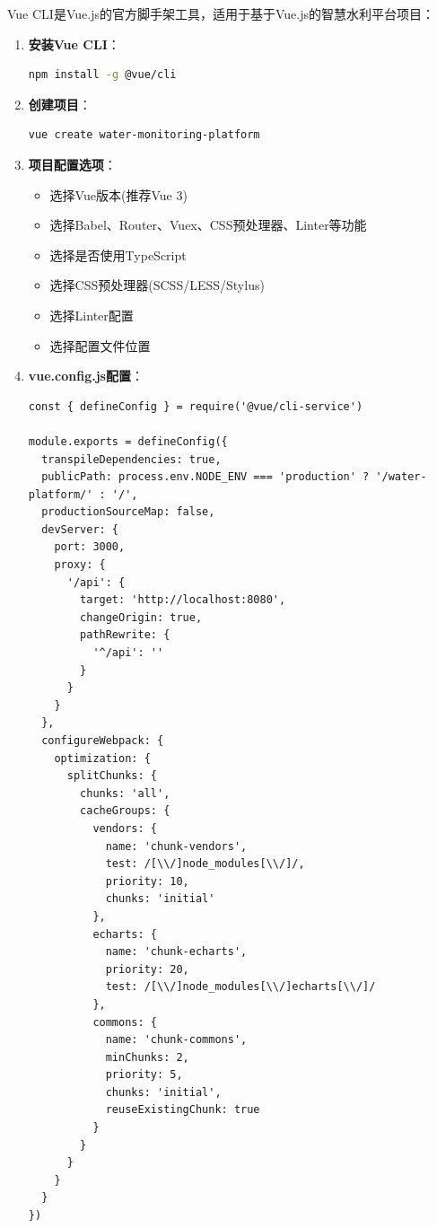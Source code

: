Vue CLI是Vue.js的官方脚手架工具，适用于基于Vue.js的智慧水利平台项目：

\begin{enumerate}
\def\labelenumi{\arabic{enumi}.}
\item
  \textbf{安装Vue CLI}：

\begin{lstlisting}[language=bash]
npm install -g @vue/cli
\end{lstlisting}
\item
  \textbf{创建项目}：

\begin{lstlisting}[language=bash]
vue create water-monitoring-platform
\end{lstlisting}
\item
  \textbf{项目配置选项}：

  \begin{itemize}
  \tightlist
  \item
    选择Vue版本(推荐Vue 3)
  \item
    选择Babel、Router、Vuex、CSS预处理器、Linter等功能
  \item
    选择是否使用TypeScript
  \item
    选择CSS预处理器(SCSS/LESS/Stylus)
  \item
    选择Linter配置
  \item
    选择配置文件位置
  \end{itemize}
\item
  \textbf{vue.config.js配置}：

\begin{lstlisting}
const { defineConfig } = require('@vue/cli-service')

module.exports = defineConfig({
  transpileDependencies: true,
  publicPath: process.env.NODE_ENV === 'production' ? '/water-platform/' : '/',
  productionSourceMap: false,
  devServer: {
    port: 3000,
    proxy: {
      '/api': {
        target: 'http://localhost:8080',
        changeOrigin: true,
        pathRewrite: {
          '^/api': ''
        }
      }
    }
  },
  configureWebpack: {
    optimization: {
      splitChunks: {
        chunks: 'all',
        cacheGroups: {
          vendors: {
            name: 'chunk-vendors',
            test: /[\\/]node_modules[\\/]/,
            priority: 10,
            chunks: 'initial'
          },
          echarts: {
            name: 'chunk-echarts',
            priority: 20,
            test: /[\\/]node_modules[\\/]echarts[\\/]/
          },
          commons: {
            name: 'chunk-commons',
            minChunks: 2,
            priority: 5,
            chunks: 'initial',
            reuseExistingChunk: true
          }
        }
      }
    }
  }
})
\end{lstlisting}
\end{enumerate}


